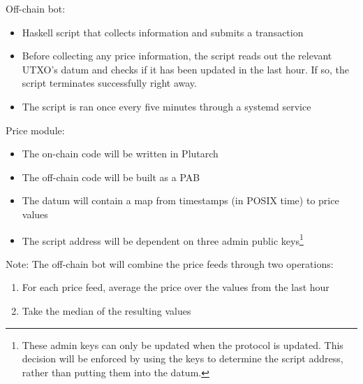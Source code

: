 \documentclass{article} %
\begin{document}
Off-chain bot:
\begin{itemize}
  \item Haskell script that collects information and submits a transaction
  \item Before collecting any price information, the script reads out the
    relevant UTXO's datum and checks if it has been updated in the last hour. If
    so, the script terminates successfully right away.
  \item The script is ran once every five minutes through a systemd service
\end{itemize}

Price module:
\begin{itemize}
  \item The on-chain code will be written in Plutarch
  \item The off-chain code will be built as a PAB
  \item The datum will contain a map from timestamps (in POSIX time) to price
    values
  \item The script address will be dependent on three admin public
    keys\footnote{
      These admin keys can only be updated when the protocol is updated.
      This decision will be enforced by using the keys to determine the script
      address, rather than putting them into the datum.
    }
\end{itemize}

Note: The off-chain bot will combine the price feeds through two operations:
\begin{enumerate}
  \item For each price feed, average the price over the values from the last
    hour
  \item Take the median of the resulting values
\end{enumerate}
\end{document}
